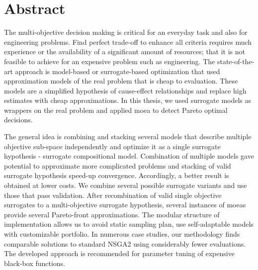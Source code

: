 \section{Abstract}
    The multi-objective decision making is critical for an everyday task and also for engineering problems. Find perfect trade-off to enhance all criteria requires much experience or the availability of a significant amount of resources; that it is not feasible to achieve for an expensive problem such as engineering. The state-of-the-art approach is model-based or surrogate-based optimization that used approximation models of the real problem that is cheap to evaluation. These models are a simplified hypothesis of cause-effect relationships and replace high estimates with cheap approximations. In this thesis, we used surrogate models as wrappers on the real problem and applied \gls{moea} to detect  Pareto optimal decisions. 
    
    The general idea is combining and stacking several models that describe multiple objective sub-space independently and optimize it as a single surrogate hypothesis - surrogate compositional model. Combination of multiple models gave potential to approximate more complicated problems and stacking of valid surrogate hypothesis speed-up convergence. Accordingly, a better result is obtained at lower costs.
    We combine several possible surrogate variants and use those that pass validation. After recombination of valid single objective surrogates to a multi-objective surrogate hypothesis, several instances of \gls{moea}s provide several Pareto-front approximations. The modular structure of implementation allows us to avoid static sampling plan, use self-adaptable models with customizable portfolio. In numerous case studies, our methodology finds comparable solutions to standard NSGA2 using considerably fewer evaluations. The developed approach is recommended for parameter tuning of expensive black-box functions.